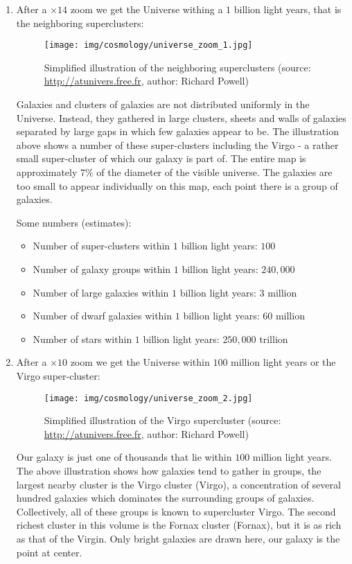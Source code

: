 \begin{enumerate}
		\item After a $\times 14$ zoom we get the Universe withing a $1$ billion light years, that is the neighboring superclusters:
		\begin{figure}[H]
			\centering
			\texttt{[image: img/cosmology/universe\_zoom\_1.jpg]}
			\caption[Simplified illustration of the neighboring superclusters]{Simplified illustration of the neighboring superclusters (source: \url{http://atunivers.free.fr}, author: Richard Powell)}
		\end{figure}
		Galaxies and clusters of galaxies are not distributed uniformly in the Universe. Instead, they gathered in large clusters, sheets and walls of galaxies separated by large gaps in which few galaxies appear to be. The illustration above shows a number of these super-clusters including the Virgo - a rather small super-cluster of which our galaxy is part of. The entire map is approximately $7\%$ of the diameter of the visible universe. The galaxies are too small to appear individually on this map, each point there is a group of galaxies.
		
		Some numbers (estimates):
		\begin{itemize}
			\item Number of super-clusters within $1$ billion light years: $100$
			\item Number of galaxy groups within $1$ billion light years: $240,000$
			\item Number of large galaxies within $1$ billion light years: $3$ million
			\item Number of dwarf galaxies within $1$ billion light years: $60$ million
			\item Number of stars within $1$ billion light years: $250,000$ trillion
		\end{itemize}
		
		\item After a $\times 10$ zoom we get the Universe within $100$ million light years or the Virgo super-cluster:
		\begin{figure}[H]
			\centering
			\texttt{[image: img/cosmology/universe\_zoom\_2.jpg]}
			\caption[Simplified illustration of the Virgo supercluster]{Simplified illustration of the Virgo supercluster (source: \url{http://atunivers.free.fr}, author: Richard Powell)}
		\end{figure}
		Our galaxy is just one of thousands that lie within $100$ million light years. The above illustration shows how galaxies tend to gather in groups, the largest nearby cluster is the Virgo cluster (Virgo), a concentration of several hundred galaxies which dominates the surrounding groups of galaxies. Collectively, all of these groups is known to supercluster Virgo. The second richest cluster in this volume is the Fornax cluster (Fornax), but it is as rich as that of the Virgin. Only bright galaxies are drawn here, our galaxy is the point at center.	
		

\end{enumerate}
